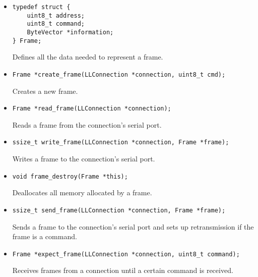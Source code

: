 \documentclass[11pt,a4paper]{article}
\begin{document}
\begin{itemize}
    \item \begin{lstlisting}
typedef struct {
    uint8_t address;
    uint8_t command;
    ByteVector *information;
} Frame;
    \end{lstlisting}

    Defines all the data needed to represent a frame.

    \item \begin{lstlisting}
Frame *create_frame(LLConnection *connection, uint8_t cmd);
    \end{lstlisting}

    Creates a new frame.

    \item \begin{lstlisting}
Frame *read_frame(LLConnection *connection);
    \end{lstlisting}

    Reads a frame from the connection's serial port.

    \item \begin{lstlisting}
ssize_t write_frame(LLConnection *connection, Frame *frame);
    \end{lstlisting}

    Writes a frame to the connection's serial port.

    \item \begin{lstlisting}
void frame_destroy(Frame *this);
    \end{lstlisting}

    Deallocates all memory allocated by a frame.

    \item \begin{lstlisting}
ssize_t send_frame(LLConnection *connection, Frame *frame);
    \end{lstlisting}

    Sends a frame to the connection's serial port and sets up retransmission if the frame is a command.

    \item \begin{lstlisting}
Frame *expect_frame(LLConnection *connection, uint8_t command);
    \end{lstlisting}

    Receives frames from a connection until a certain command is received.
\end{itemize}
\end{document}
